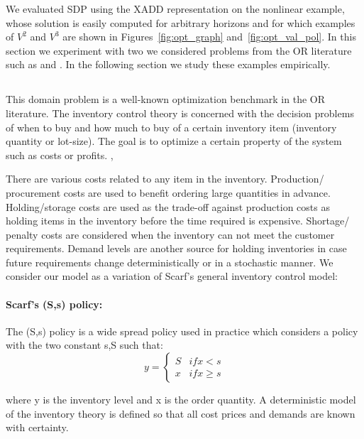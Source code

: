 \label{sec:results}
 
We evaluated SDP using the XADD representation on the nonlinear
\MarsRover example, whose solution is easily computed for arbitrary
horizons and for which examples of $V^2$ and $V^3$ are shown in
Figures~\ref{fig:opt_graph} and~\ref{fig:opt_val_pol}.  In this
section we experiment with two we considered problems from the OR
literature such as \InventoryControl and \WaterReservoir. In the
following section we study these examples empirically.
 

\subsection{\InventoryControl}
This domain problem is a well-known optimization benchmark in the OR
literature. The inventory control theory is concerned with the decision problems of when to buy and how much to buy of a certain inventory item (inventory quantity or lot-size). The goal is to optimize a certain property of the system such as costs or profits. \cite{Scarf2002}, \cite{Scarf_Karlin58} 

There are various costs related to any item in the inventory. Production/ procurement costs are used to benefit ordering large quantities in advance. Holding/storage costs are used as the trade-off against production costs as holding items in the inventory before the time required is expensive. Shortage/ penalty costs are considered when the inventory can not meet the customer requirements. Demand levels are another source for holding inventories in case future requirements change deterministically or in a stochastic manner. 
We consider our model as a variation of Scarf's general inventory control model:
 
\paragraph*{Scarf's (S,s) policy:}
The (S,s) policy is a wide spread policy used in practice which considers a policy with the two constant s,S such that: 
\[y = \begin{cases}
S & if x<s \\
x & if x \geq s
\end{cases}\]

where y is the inventory level and x is the order quantity.  A deterministic model of the inventory theory is defined so that all cost prices and demands are known with certainty. 

